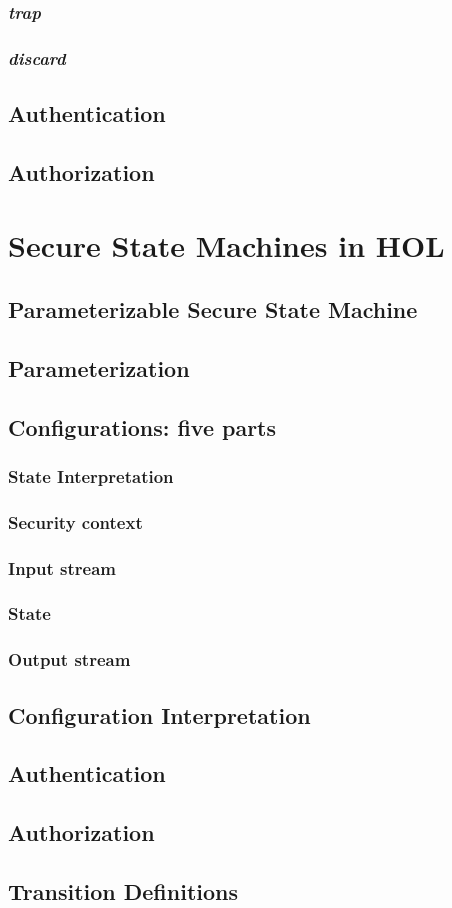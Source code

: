 \documentclass[../../main/main.tex]{subfiles}
\begin{document}
\subsubsection{\textit{trap}}
\subsubsection{\textit{discard}}

\subsection{Authentication}
\subsection{Authorization}


\section{Secure State Machines in HOL}\label{sec:sminHOL}

\subsection{Parameterizable Secure State Machine}
\subsection{Parameterization}

\subsection{Configurations: five parts}

\subsubsection{State Interpretation}
\subsubsection{Security context}
\subsubsection{Input stream}
\subsubsection{State}
\subsubsection{Output stream}
\subsection{Configuration Interpretation}


\subsection{Authentication}
\subsection{Authorization}
\subsection{Transition Definitions}
\end{document}
